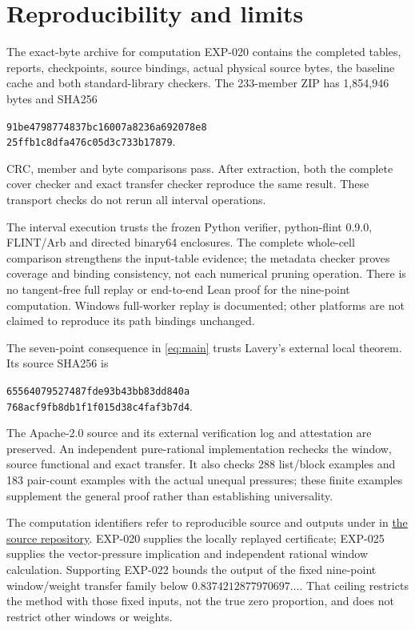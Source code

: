 \documentclass[11pt]{article}
\theoremstyle{remark}\newtheorem{remark}[theorem]{Remark}
\begin{document}
\section{Reproducibility and limits}
The exact-byte archive for computation EXP-020 contains the completed
tables, reports, checkpoints, source bindings, actual physical source bytes,
the baseline cache and both standard-library checkers. The 233-member ZIP
has 1,854,946 bytes and SHA256
\begin{center}\small\texttt{91be4798774837bc16007a8236a692078e8}\\
\texttt{25ffb1c8dfa476c05d3c733b17879}.\end{center}
CRC, member and byte comparisons pass. After extraction, both the complete
cover checker and exact transfer checker reproduce the same result.
These transport checks do not rerun all interval operations.

The interval execution trusts the frozen Python verifier, python-flint
0.9.0, FLINT/Arb and directed binary64 enclosures. The complete whole-cell
comparison strengthens the input-table evidence; the metadata checker proves
coverage and binding consistency, not each numerical pruning operation.
There is no tangent-free full replay or end-to-end Lean proof for the
nine-point computation. Windows full-worker replay is documented; other
platforms are not claimed to reproduce its path bindings unchanged.

The seven-point consequence in \eqref{eq:main} trusts Lavery's external
local theorem. Its source SHA256 is
\begin{center}\small\texttt{65564079527487fde93b43bb83dd840a}\\
\texttt{768acf9fb8db1f1f015d38c4faf3b7d4}.\end{center}
The Apache-2.0 source and its external verification log and attestation are
preserved. An independent pure-rational implementation rechecks the window,
source functional and exact transfer. It also checks 288 list/block examples
and 183 pair-count examples with the actual unequal pressures; these finite
examples supplement the general proof rather than establishing universality.

The computation identifiers refer to reproducible source and outputs under
 in
\href{https://github.com/fsantibanezleal/CAOS_RESEARCH}{the source repository}.
EXP-020 supplies the locally replayed certificate; EXP-025 supplies the
vector-pressure implication and independent rational window calculation.
Supporting EXP-022 bounds the output of the fixed nine-point
window/weight transfer family below $0.8374212877970697\ldots$.
That ceiling restricts the method with those fixed inputs, not the true zero
proportion, and does not restrict other windows or weights.
\end{document}
